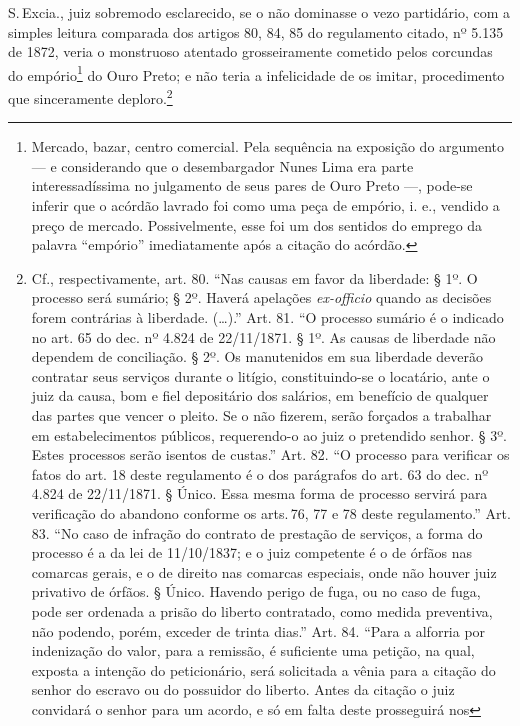 S.\,Excia., juiz sobremodo esclarecido, se o não dominasse o vezo
partidário, com a simples leitura comparada dos artigos 80, 84, 85 do
regulamento citado, nº 5.135 de 1872, veria o monstruoso atentado
grosseiramente cometido pelos corcundas do empório\footnote{Mercado,
  bazar, centro comercial. Pela sequência na exposição do argumento --- e
  considerando que o desembargador Nunes Lima era parte interessadíssima no
  julgamento de seus pares de Ouro Preto ---, pode-se inferir que o
  acórdão lavrado foi como uma peça de empório, i. e., vendido a preço
  de mercado. Possivelmente, esse foi um dos sentidos do emprego da
  palavra ``empório'' imediatamente após a citação do acórdão.} do Ouro
Preto; e não teria a infelicidade de os imitar, procedimento que
sinceramente deploro.\footnote{Cf., respectivamente, art. 80. ``Nas
  causas em favor da liberdade: § 1º. O processo será sumário; § 2º.
  Haverá apelações \emph{ex-officio} quando as decisões forem contrárias
  à liberdade. (\ldots{}).'' Art. 81. ``O processo sumário é o indicado no art.
  65 do dec. nº 4.824 de 22/11/1871. § 1º. As causas de liberdade não
  dependem de conciliação. § 2º. Os manutenidos em sua liberdade deverão
  contratar seus serviços durante o litígio, constituindo-se o
  locatário, ante o juiz da causa, bom e fiel depositário dos salários,
  em benefício de qualquer das partes que vencer o pleito. Se o não
  fizerem, serão forçados a trabalhar em estabelecimentos públicos,
  requerendo-o ao juiz o pretendido senhor. § 3º. Estes processos serão
  isentos de custas.'' Art. 82. ``O processo para verificar os fatos do art.
  18 deste regulamento é o dos parágrafos do art. 63 do dec. nº 4.824 de
  22/11/1871. § Único. Essa mesma forma de processo servirá para
  verificação do abandono conforme os arts.\,76, 77 e 78 deste
  regulamento.'' Art. 83. ``No caso de infração do contrato de prestação de
  serviços, a forma do processo é a da lei de 11/10/1837; e o juiz
  competente é o de órfãos nas comarcas gerais, e o de direito nas
  comarcas especiais, onde não houver juiz privativo de órfãos. § Único.
  Havendo perigo de fuga, ou no caso de fuga, pode ser ordenada a prisão
  do liberto contratado, como medida preventiva, não podendo, porém,
  exceder de trinta dias.'' Art. 84. ``Para a alforria por indenização do
  valor, para a remissão, é suficiente uma petição, na qual, exposta a
  intenção do peticionário, será solicitada a vênia para a citação do
  senhor do escravo ou do possuidor do liberto. Antes da citação o juiz
  convidará o senhor para um acordo, e só em falta deste prosseguirá nos
}
